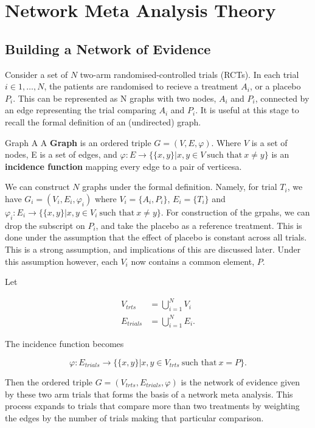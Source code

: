 \chapter{Network Meta Analysis Theory}\label{nmatheory}

\section{Building a Network of Evidence}

Consider a set of $N$ two-arm randomised-controlled trials (RCTs). In each trial $i \in 1,\ldots,N$, the patients are randomised to recieve a treatment $A_i$, or a placebo $P_i$. This can be represented as N graphs with two nodes, $A_i$ and $P_i$, connected by an edge representing the trial comparing $A_i$ and $P_i$. It is useful at this stage to recall the formal definition of an (undirected) graph. 

\begin{definition}{Graph}
A  A \textbf{Graph} is an ordered triple $G = (V, E, \varphi)$. Where  $V$ is a set of nodes, E is a set  of edges, and $\varphi : E \to \{\{ x, y \} | x, y \in V \ \text{such that} \ x \neq y \}$ is an  \textbf{incidence function} mapping every edge to a pair of verticesa.
\end{definition}

We can construct $N$ graphs under the formal definition. Namely, for trial $T_i$, we have $G_i = (V_i, E_i, \varphi_i)$ where $V_i = \{ A_i, P_i \}$, $E_i = \{T_i\}$ and $\varphi_i : E_i \to \{ \{ x, y \} | x, y \in V_i \ \text{such that} \  x \neq y \}$. For construction of the grpahs, we can drop the subscript on $P_i$, and take the placebo as a reference treatment. This is done under the assumption that the effect of placebo is constant across all trials. This is a strong assumption, and implications of this are discussed later. Under this assumption however, each $V_i$ now contains a common element, $P$.

Let

\begin{align*}
    V_{trts} &= \bigcup_{i=1}^{N} V_i \\
    E_{trials} &= \bigcup_{i=1}^{N} E_i
.\end{align*}

The incidence function becomes 

\[
    \varphi : E_{trials} \to \{ \{x, y \} | x, y \in V_{trts} \ \text{such that} \ x = P \}
.\] 

Then the ordered triple $G = (V_{trts}, E_{trials}, \varphi)$ is the network of evidence given by these two arm trials that forms the basis of a network meta analysis. This process expands to trials that compare more than two treatments by weighting the edges by the number of trials making that particular comparison.

